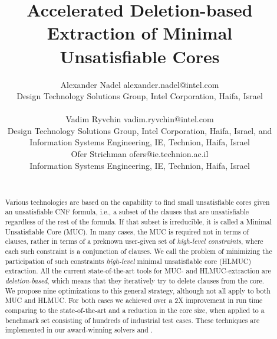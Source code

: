 \documentclass[twoside,11pt]{article}
\newcommand\haifamuc{\tool{HaifaMUC}\xspace}
\newcommand\haifahlmuc{\tool{HaifaHLMUC}\xspace}
\begin{document}


\newcommand\full[1]{}
\newcommand\short[1]{#1}
\title{Accelerated Deletion-based Extraction of Minimal Unsatisfiable Cores}
\author{\name Alexander Nadel
\email alexander.nadel@intel.com \\
\addr Design Technology Solutions Group, Intel Corporation, Haifa,
Israel \\
\mbox{ }\\
%
\name Vadim Ryvchin
\email vadim.ryvchin@intel.com \\
\addr Design Technology Solutions Group, Intel Corporation, Haifa, Israel, and \\ Information Systems Engineering, IE, Technion, Haifa, Israel \\
%
\name Ofer Strichman
\email ofers@ie.technion.ac.il \\
\addr Information Systems Engineering, IE, Technion, Haifa, Israel \\
\mbox{ }\\
}

\maketitle

\begin{abstract}
Various technologies are based on the capability to find small unsatisfiable cores given an unsatisfiable CNF formula, i.e., a subset of the clauses that are unsatisfiable regardless of the rest of the formula.
If that subset is irreducible, it is called a Minimal Unsatisfiable Core (MUC).
In many cases, the MUC is required not in terms of clauses, rather in terms of a preknown user-given set of \emph{high-level constraints}, where each such constraint is a conjunction of clauses.
We call the problem of minimizing the participation of such
constraints \emph{high-level} minimal unsatisfiable
core (HLMUC) extraction. All the current state-of-the-art tools for MUC- and HLMUC-extraction are \emph{deletion-based}, which means that they iteratively try to delete clauses from the core.
We propose nine optimizations to this general strategy, although not all apply to
both MUC and HLMUC. For both cases we achieved over a 2X improvement in run
time comparing to the state-of-the-art and a reduction in the core size, when
applied to a benchmark set consisting of hundreds of industrial test cases.
These techniques are implemented in our award-winning solvers \haifamuc and
\haifahlmuc.
\end{abstract}
\end{document}
